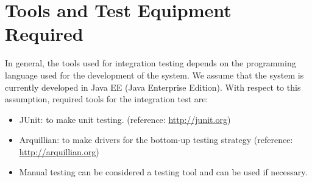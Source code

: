 \documentclass[../../testPlan.tex]{subfiles}
\begin{document}
	\chapter{Tools and Test Equipment Required}

			In general, the tools used for integration testing depends on the programming language used for the development of the system.
			We assume that the system is currently developed in Java EE (Java Enterprise Edition).
			With respect to this assumption, required tools for the integration test are:
			\begin{itemize}
				\item JUnit: to make unit testing. (reference: \url{http://junit.org})
				\item Arquillian: to make drivers for the bottom-up testing strategy (reference: \url{http://arquillian.org})
				\item Manual testing can be considered a testing tool and can be used if necessary.
			\end{itemize}
\end{document}
